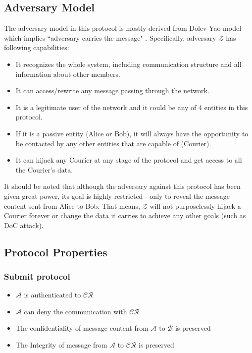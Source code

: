 \documentclass[10pt,a4paper]{article}
\begin{document}
\subsection*{Adversary Model}

The adversary model in this protocol is mostly derived from Dolev-Yao model which implies ``adversary carries the message" \cite{dolev}. Specifically, adversary $\mathcal{Z}$ has following capabilities:
\begin{itemize}
\item It recognizes the whole system, including communication structure and all information about other members.
\item It can access/rewrite any message passing through the network.
\item It is a legitimate user of the network and it could be any of 4 entities in this protocol.
\item If it is a passive entity (Alice or Bob), it will always have the opportunity to be contacted by any other entities that are capable of (Courier).
\item It can hijack any Courier at any stage of the protocol and get access to all the Courier's data.
\end{itemize}
It should be noted that although the adversary against this protocol has been given great power, its goal is highly restricted - only to reveal the message content sent from Alice to Bob. That means, $\mathcal{Z}$ will not purposelessly hijack a Courier forever or change the data it carries to achieve any other goals (such as DoC attack).

\subsection*{Protocol Properties}
\subsubsection*{Submit protocol}
\begin{itemize}
\item $\mathcal{A}$ is authenticated to $\mathcal{CR}$
\item $\mathcal{A}$ can deny the communication with $\mathcal{CR}$
\item The confidentiality of message content from $\mathcal{A}$ to $\mathcal{B}$ is preserved
\item The Integrity of message from $\mathcal{A}$ to $\mathcal{CR}$ is preserved
\end{itemize}
\end{document}

